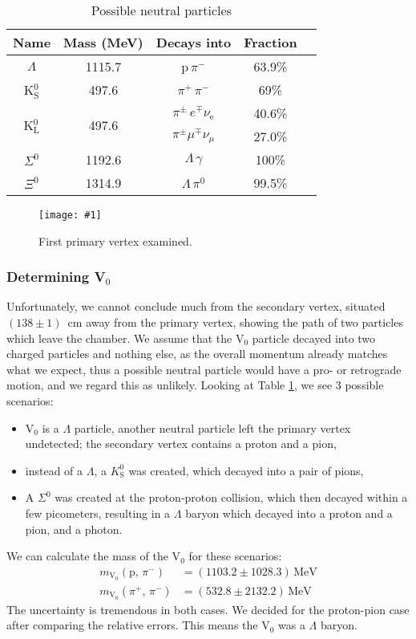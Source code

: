 \documentclass[twocolumn]{article}
\newcommand{\insertFigure}[1]{%
   \texttt{[image: \#1]}%
}
\begin{document}
\fi
\begin{table}
\centering
\begin{tabular}{|c|c|c|c|c|}
\hline
Name & Mass (MeV) & Decays into & Fraction \\
\hline
$\Lambda$ 	& 1115.7 & p$\, \pi^-$ & 63.9\%\\
\hline
K$^0_{\text{S}}$	 & 497.6 & $\pi^+ \, \pi^-$ & 69\%\\
\hline
\multirow{2}{*}{K$^0_{\text{L}}$} &  \multirow{2}{*}{ 497.6}& $\pi^{\pm} \, e^{\mp} \nu_{\text{e}}$ & 40.6\%\\
 & &$\pi^{\pm} \mu ^{\mp} \nu_{\mu}$&27.0\%\\
\hline
$\Sigma^0$ & 1192.6 & $\Lambda \, \gamma$ & 100\%\\
\hline
$\Xi^0$ & 1314.9 & $\Lambda \, \pi^0$ & 99.5\%\\
\hline
\end{tabular}
\caption{Possible neutral particles\cite{pdg}}
\label{tab:neutral}
\end{table}
\begin{figure}
\centering
\insertFigure{Images/primary_1.png}
\caption{First primary vertex examined.}
\label{fig:primary1}
\end{figure}
\subsubsection{Determining V$_0$}
Unfortunately, we cannot conclude much from the secondary vertex, situated $(138 \pm 1)$~cm away from the primary vertex, showing the path of two particles which leave the chamber. We assume that the V$_0$ particle decayed into two charged particles and nothing else, as the overall momentum already matches what we expect, thus a possible neutral particle would have a pro- or retrograde motion, and we regard this as unlikely. Looking at Table \ref{tab:neutral}, we see 3 possible scenarios:
\begin{itemize}
\item V$_0$ is a $\Lambda$ particle, another neutral particle left the primary vertex undetected; the secondary vertex contains a proton and a pion,
\item instead of a $\Lambda$, a $K^0_{\text{S}}$ was created, which decayed into a pair of pions,
\item A $\Sigma^0$ was created at the proton-proton collision, which then decayed within a few picometers, resulting in a $\Lambda$ baryon which decayed into a proton and a pion, and a photon.
\end{itemize}
We can calculate the mass of the V$_0$ for these scenarios:
\begin{align*}
m_{\text{V}_0} ( \text{p}, \, \pi^-) &= (1103.2 \pm 1028.3)\, \text{MeV}\\
m_{\text{V}_0} ( \pi^+, \, \pi^- ) &= (532.8 \pm 2132.2)\, \text{MeV}
\end{align*}
The uncertainty is tremendous in both cases. We decided for the proton-pion case after comparing the relative errors. This means the V$_0$ was a $\Lambda$ baryon.
\end{document}
